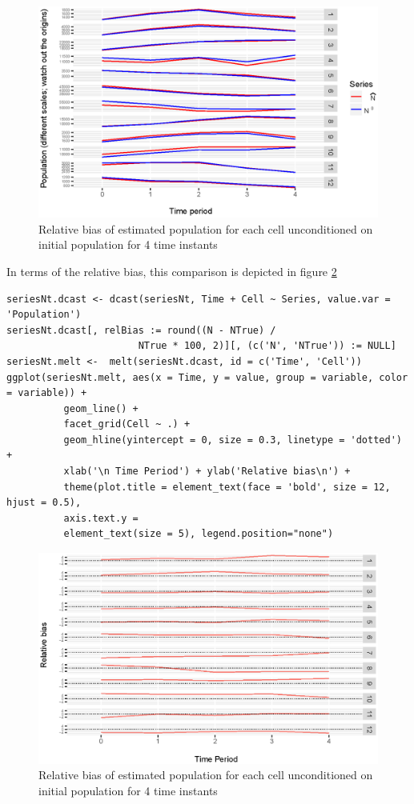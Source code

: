 \documentclass[12pt, a4paper]{article}
\begin{document}
\begin{figure}
	\centering
	\includegraphics[scale=0.85]{time5.eps}
	\caption{Relative bias of estimated population for each cell unconditioned on initial population for 4 time instants}
	\label{time5} 	
\end{figure}

In terms of the relative bias, this comparison is depicted in figure \ref{time6}

\begin{verbatim}
seriesNt.dcast <- dcast(seriesNt, Time + Cell ~ Series, value.var = 'Population')
seriesNt.dcast[, relBias := round((N - NTrue) / 
                       NTrue * 100, 2)][, (c('N', 'NTrue')) := NULL]
seriesNt.melt <-  melt(seriesNt.dcast, id = c('Time', 'Cell'))
ggplot(seriesNt.melt, aes(x = Time, y = value, group = variable, color = variable)) + 
          geom_line() + 
          facet_grid(Cell ~ .) +
          geom_hline(yintercept = 0, size = 0.3, linetype = 'dotted') + 
          xlab('\n Time Period') + ylab('Relative bias\n') +
          theme(plot.title = element_text(face = 'bold', size = 12, hjust = 0.5), 
          axis.text.y =
          element_text(size = 5), legend.position="none")
\end{verbatim}

\begin{figure}
	\centering
	\includegraphics[scale=0.85]{time6.eps}
	\caption{Relative bias of estimated population for each cell unconditioned on initial population for 4 time instants}
	\label{time6} 	
\end{figure}
\end{document}
